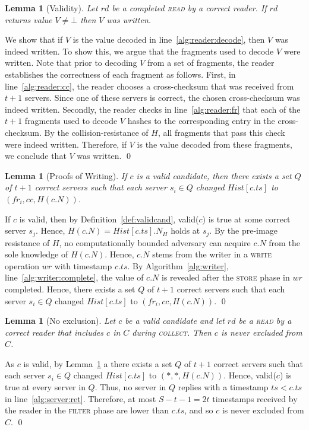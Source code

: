 \documentclass[10pt,conference,compsocconf]{IEEEtran}
\newtheorem{la}[defn]{Lemma}
\newenvironment{prooff}{\vspace{1ex}\noindent{\bf Proof:}\hspace{0.5em}}
	{\hfill\qed\vspace{1em}}
\begin{document}
\begin{la}[Validity]\label{la:validity}
Let $rd$ be a completed \textsc{read} by a correct reader. If $rd$ returns value $V \neq \bot$ then $V$ was written.
\end{la}
\begin{prooff} We show that if $V$ is the value decoded in line~\ref{alg:reader:decode}, then $V$ was indeed written. To show this, we argue that the fragments used to decode $V$ were written. Note that prior to decoding $V$ from a set of fragments, the reader establishes the correctness of each fragment as follows. First, in line~\ref{alg:reader:cc}, the reader chooses a cross-checksum that was received from $t+1$ servers. Since one of these servers is correct, the chosen cross-checksum was indeed written. Secondly, the reader checks in line~\ref{alg:reader:fr} that each of the $t+1$ fragments used to decode $V$ hashes to the corresponding entry in the cross-checksum.  By the collision-resistance of $H$, all fragments that pass this check were indeed written. Therefore, if $V$ is the value decoded from these fragments, we conclude that $V$ was written.
\end{prooff}

\begin{la}[Proofs of Writing] \label{la:pow}
If $c$ is a valid candidate, then there exists a set $Q$ of $t+1$ correct servers such that each server $s_i \in Q$ changed $Hist[c.ts]$ to $(fr_i,cc,H(c.N))$.
\end{la}
\begin{prooff}
If $c$ is valid, then by Definition~\ref{def:validcand}, \textsf{valid}($c$) is true at some correct server $s_j$. Hence, $H(c.N) = Hist[c.ts].N_H$ holds at $s_j$. By the pre-image resistance of $H$, no computationally bounded adversary can acquire $c.N$ from the sole knowledge of $H(c.N)$. Hence, $c.N$ stems from the writer in a \textsc{write} operation $wr$ with timestamp $c.ts$. By Algorithm~\ref{alg:writer}, line~\ref{alg:writer:complete}, the value of $c.N$ is revealed after the \textsc{store} phase in $wr$ completed. Hence, there exists a set $Q$ of $t+1$ correct servers such that each server $s_i \in Q$ changed $Hist[c.ts]$ to $(fr_i,cc,H(c.N))$.
\end{prooff}

\begin{la}[No exclusion]\label{la:noexclusion}
Let $c$ be a valid candidate and let $rd$ be a \textsc{read} by a correct reader that includes $c$ in $C$ during \textsc{collect}. Then $c$ is never excluded from $C$.
\end{la}
\begin{prooff}
As $c$ is valid, by Lemma~\ref{la:pow} a there exists a set $Q$ of $t+1$ correct servers such that each server $s_i \in Q$ changed $Hist[c.ts]$ to $(*,*,H(c.N))$. Hence, \textsf{valid}($c$) is true at every server in $Q$. Thus, no server in $Q$ replies with a timestamp $ts < c.ts$ in line~\ref{alg:server:ret}.
Therefore, at most $S-t-1= 2t$ timestamps received by the reader in the \textsc{filter} phase are lower than $c.ts$, and so $c$ is never excluded from $C$.
\end{prooff}
\end{document}
